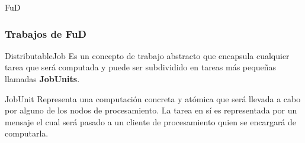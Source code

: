 \begin{subsection}{FuD}
	\begin{frame}\frametitle{Trabajos de FuD}
		\begin{block}{DistributableJob}
			Es un concepto de trabajo abstracto que encapsula cualquier tarea que será computada y puede ser subdividido en tareas más
			pequeñas llamadas \textbf{JobUnits}.
		\end{block}
		
		\pause
		\begin{block}{JobUnit}
			Representa una computación concreta y atómica que será llevada a cabo por alguno de los nodos de procesamiento. La tarea en 
			sí es representada por un mensaje el cual será pasado a un cliente de procesamiento quien se encargará de computarla.
		\end{block}
		
		\begin{center}
		\end{center}
	\end{frame}
	
\end{subsection}

